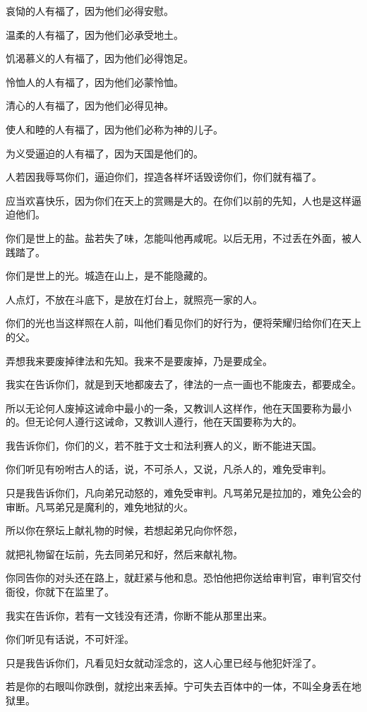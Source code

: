 \documentclass[12pt,oneside]{book}
\begin{document}
哀恸的人有福了，因为他们必得安慰。

温柔的人有福了，因为他们必承受地土。

饥渴慕义的人有福了，因为他们必得饱足。

怜恤人的人有福了，因为他们必蒙怜恤。

清心的人有福了，因为他们必得见神。

使人和睦的人有福了，因为他们必称为神的儿子。

为义受逼迫的人有福了，因为天国是他们的。

人若因我辱骂你们，逼迫你们，捏造各样坏话毁谤你们，你们就有福了。

应当欢喜快乐，因为你们在天上的赏赐是大的。在你们以前的先知，人也是这样逼迫他们。

你们是世上的盐。盐若失了味，怎能叫他再咸呢。以后无用，不过丢在外面，被人践踏了。

你们是世上的光。城造在山上，是不能隐藏的。

人点灯，不放在斗底下，是放在灯台上，就照亮一家的人。

你们的光也当这样照在人前，叫他们看见你们的好行为，便将荣耀归给你们在天上的父。

弄想我来要废掉律法和先知。我来不是要废掉，乃是要成全。

我实在告诉你们，就是到天地都废去了，律法的一点一画也不能废去，都要成全。

所以无论何人废掉这诫命中最小的一条，又教训人这样作，他在天国要称为最小的。但无论何人遵行这诫命，又教训人遵行，他在天国要称为大的。

我告诉你们，你们的义，若不胜于文士和法利赛人的义，断不能进天国。

你们听见有吩咐古人的话，说，不可杀人，又说，凡杀人的，难免受审判。

只是我告诉你们，凡向弟兄动怒的，难免受审判。凡骂弟兄是拉加的，难免公会的审断。凡骂弟兄是魔利的，难免地狱的火。

所以你在祭坛上献礼物的时候，若想起弟兄向你怀怨，

就把礼物留在坛前，先去同弟兄和好，然后来献礼物。

你同告你的对头还在路上，就赶紧与他和息。恐怕他把你送给审判官，审判官交付衙役，你就下在监里了。

我实在告诉你，若有一文钱没有还清，你断不能从那里出来。

你们听见有话说，不可奸淫。

只是我告诉你们，凡看见妇女就动淫念的，这人心里已经与他犯奸淫了。

若是你的右眼叫你跌倒，就挖出来丢掉。宁可失去百体中的一体，不叫全身丢在地狱里。
\end{document}
